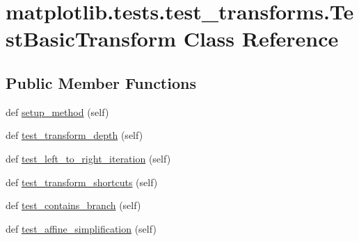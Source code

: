 \hypertarget{classmatplotlib_1_1tests_1_1test__transforms_1_1TestBasicTransform}{}\section{matplotlib.\+tests.\+test\+\_\+transforms.\+Test\+Basic\+Transform Class Reference}
\label{classmatplotlib_1_1tests_1_1test__transforms_1_1TestBasicTransform}
\subsection*{Public Member Functions}
\begin{DoxyCompactItemize}
\item 
def \hyperlink{classmatplotlib_1_1tests_1_1test__transforms_1_1TestBasicTransform_a5562a78f27d717cdeb2ecc4c5f97087b}{setup\+\_\+method} (self)
\item 
def \hyperlink{classmatplotlib_1_1tests_1_1test__transforms_1_1TestBasicTransform_aebca0718403ca3e72033772b9a3433bc}{test\+\_\+transform\+\_\+depth} (self)
\item 
def \hyperlink{classmatplotlib_1_1tests_1_1test__transforms_1_1TestBasicTransform_a9cb86127e258e47bed11af31b438d1dd}{test\+\_\+left\+\_\+to\+\_\+right\+\_\+iteration} (self)
\item 
def \hyperlink{classmatplotlib_1_1tests_1_1test__transforms_1_1TestBasicTransform_ad0d627d88009a15b475e32bf2e81d439}{test\+\_\+transform\+\_\+shortcuts} (self)
\item 
def \hyperlink{classmatplotlib_1_1tests_1_1test__transforms_1_1TestBasicTransform_af60fc5ec7b063a1ce49a01508781cf35}{test\+\_\+contains\+\_\+branch} (self)
\item 
def \hyperlink{classmatplotlib_1_1tests_1_1test__transforms_1_1TestBasicTransform_af881a35dbf7b05d63758ea63cd9beca1}{test\+\_\+affine\+\_\+simplification} (self)
\end{DoxyCompactItemize}
